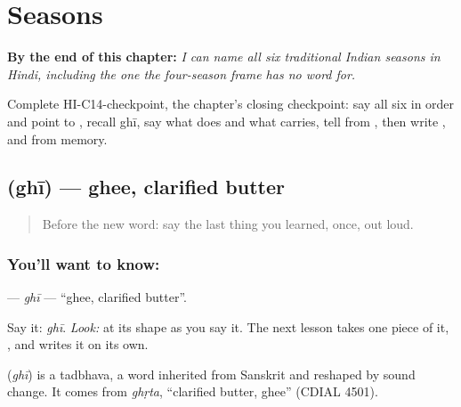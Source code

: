 
\chapter{Seasons}
\label{ch:hi-seasons}

\begin{chapteropening}
\textbf{By the end of this chapter:} \emph{I can name all six traditional Indian seasons in Hindi, including the one the four-season frame has no word for.}

Complete HI-C14-checkpoint, the chapter's closing checkpoint: say all six  in order and point to , recall ghī, say what  does and what  carries, tell  from , then write ,  and  from memory.
\end{chapteropening}

\section[\texorpdfstring{\hi{घी} (ghī)}{घी (ghī)}]{ (ghī) — ghee, clarified butter}

\label{lesson:HI-C14-ghee}



\begin{quote}
Before the new word: say the last thing you learned, once, out loud.
\end{quote}

\subsection*{You'll want to know: }
\textbf{} — \emph{ghī} — \textquotedblleft{}ghee, clarified butter\textquotedblright{}.

Say it: \emph{ghī}. \emph{Look:} at its shape as you say it. The next lesson takes one piece of it, \textbf{}, and writes it on its own.

\begin{cousinweb}
\textbf{} (\emph{ghī}) is a tadbhava, a word inherited from Sanskrit and reshaped by sound change. It comes from \emph{ghṛta}, \textquotedblleft{}clarified butter, ghee\textquotedblright{} (CDIAL 4501).
\end{cousinweb}

